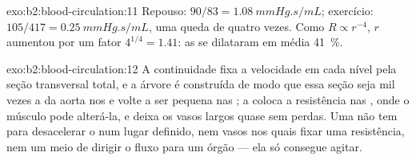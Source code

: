 \begin{solution}{exo:b2:blood-circulation:11}
Repouso: $90/83 = \qty{1.08}{mmHg.s/mL}$; exercício: $105/417 =
\qty{0.25}{mmHg.s/mL}$, uma queda de quatro vezes. Como $R \propto r^{-4}$,
$r$ aumentou por um fator $4^{1/4} = 1.41$: as  se dilataram
em média \qty{41}{\%}.
\end{solution}

\begin{solution}{exo:b2:blood-circulation:12}
A continuidade fixa a velocidade em cada nível pela seção transversal
total, e a árvore é construída de modo que essa seção seja mil vezes a
da aorta nos  e volte a ser pequena nas ; a  coloca a resistência nas , onde o músculo pode
alterá-la, e deixa os vasos largos quase sem perdas. Uma  não tem  para desacelerar o  num lugar definido,
nem vasos nos quais fixar uma resistência, nem um meio de dirigir o
fluxo para um órgão --- ela só consegue agitar.
\end{solution}

